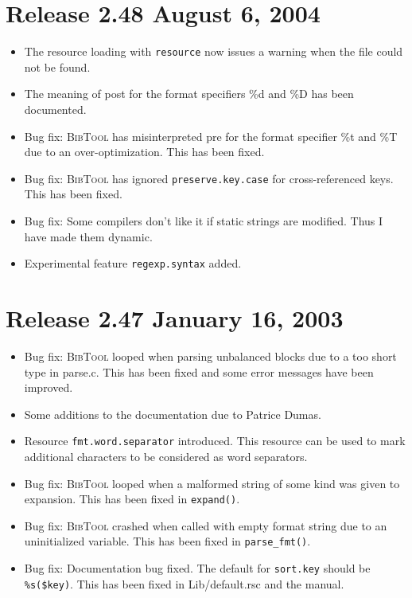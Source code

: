 \documentclass[11pt,a4paper]{scrartcl}
\newcommand\rsc[1]{\texttt{#1}}
\newcommand\File[1]{\textsf{#1}}
\newcommand\BibTool{\textsc{BibTool}}
\newenvironment{Release}[2]{%
  \def\tmp{#2}%
  \section*{Release #1 \ifx\tmp\empty\else{\normalsize[#2]}\fi}
  \begin{itemize}
}{\end{itemize}}
\newenvironment{Fix}[1]{\item }{}
\newenvironment{New}[1]{\item }{}
\newenvironment{Doc}[1]{\item }{}
\begin{document}
\begin{multicols}
\begin{Release}{2.48}{August 6, 2004}
\begin{New}{gene}
    The resource loading with \rsc{resource} now issues a warning when
    the file could not be found.
  \end{New}
  \begin{Doc}{gene}
    The meaning of post for the format specifiers \%d and \%D has been
    documented.
  \end{Doc}
  \begin{Fix}{gene}
    Bug fix: \BibTool{} has misinterpreted pre for the format specifier
    \%t and \%T due to an over-optimization. This has been fixed.
  \end{Fix}
  \begin{Fix}{gene}
    Bug fix: \BibTool{} has ignored \rsc{preserve.key.case} for
    cross-referenced keys. This has been fixed.
  \end{Fix}
  \begin{Fix}{gene}
    Bug fix: Some compilers don't like it if static strings are
    modified. Thus I have made them dynamic.
  \end{Fix}
  \begin{New}{gene}
    Experimental feature \rsc{regexp.syntax} added.
  \end{New}
 \end{Release}

 \begin{Release}{2.47}{January 16, 2003}
  \begin{Fix}{gene}
    Bug fix: \BibTool{} looped when parsing unbalanced blocks due to a
    too short type in \File{parse.c}. This has been fixed and some
    error messages have been improved.
  \end{Fix}
  \begin{Doc}{gene}
    Some additions to the documentation due to Patrice Dumas.
  \end{Doc}
  \begin{New}{gene}
    Resource \rsc{fmt.word.separator} introduced. This resource can be
    used to mark additional characters to be considered as word
    separators.
  \end{New}
  \begin{Fix}{gene}
    Bug fix: \BibTool{} looped when a malformed string of some kind was
    given to expansion. This has been fixed in \verb|expand()|.
  \end{Fix}
  \begin{Fix}{gene}
    Bug fix: \BibTool{} crashed when called with empty format string
    due to an uninitialized variable. This has been fixed in
    \verb|parse_fmt()|.
  \end{Fix}
  \begin{Doc}{gene}
    Bug fix: Documentation bug fixed. The default for \rsc{sort.key}
    should be \verb|%s($key)|. This has been fixed in
    \File{Lib/default.rsc} and the manual.
  \end{Doc}
 \end{Release}


\end{multicols}
\end{document}
